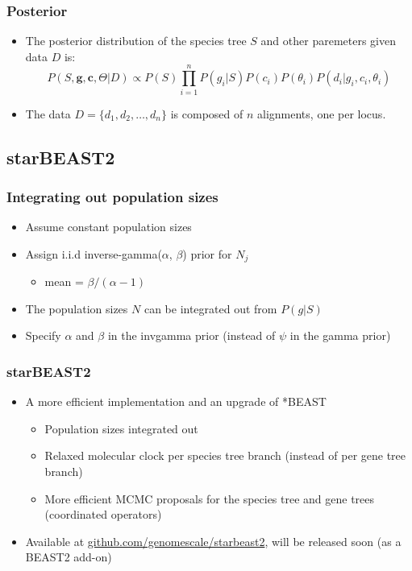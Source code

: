 \begin{frame}\frametitle{Posterior}
	\begin{itemize}
		\item The posterior distribution of the species tree $S$ and other paremeters given data $D$ is:
		\[ P(S, \mathbf{g, c}, \Theta|D) \propto P(S) \prod_{i=1}^n P(g_i|S) P(c_i) P(\theta_i) P(d_i|g_i,c_i,\theta_i) \]
		\item The data $D = \{d_1, d_2, \dots, d_n\}$ is composed of $n$ alignments, one per locus.
	\end{itemize}
\end{frame}

\subsection{starBEAST2}

\begin{frame}\frametitle{Integrating out population sizes}
	\begin{itemize}
		\item Assume constant population sizes
		\item Assign i.i.d inverse-gamma($\alpha$, $\beta$) prior for $N_j$ 
		\begin{itemize}
			\item mean = $\beta / (\alpha -1)$
		\end{itemize}
		\item The population sizes $N$ can be integrated out from $P(g|S)$ \cite{Jones:2015jf}
		\vskip 0.4cm
		\item Specify $\alpha$ and $\beta$ in the invgamma prior (instead of $\psi$ in the gamma prior)
	\end{itemize}
\end{frame}

\begin{frame}\frametitle{starBEAST2}
	\begin{itemize}
		\item A more efficient implementation and an upgrade of *BEAST
		\begin{itemize}
			\item Population sizes integrated out \cite{Jones:2015jf}
			\item Relaxed molecular clock per species tree branch (instead of per gene tree branch)
			\item More efficient MCMC proposals for the species tree and gene trees (coordinated operators) \cite{Jones:2015jf, Rannala:2015wk}
		\end{itemize}
		\item Available at \url{github.com/genomescale/starbeast2}, will be released soon (as a BEAST2 add-on)
	\end{itemize}
\end{frame}

